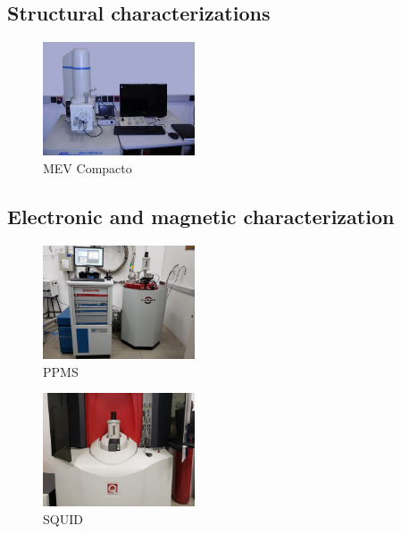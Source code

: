 \documentclass[prd,amsfonts,onecolumn,superscriptaddress,aps,nofootinbib,11pt]{revtex4}
\begin{document}
\subsection{Structural characterizations}

\begin{figure}[H]
    \centering
    \includegraphics[width=0.4\textwidth]{experiments/MEV_compacto0.jpg}
    \caption{MEV Compacto}
    \label{fig:exp:MEV}
\end{figure}


\subsection{Electronic and magnetic characterization}

\begin{figure}[H]
    \centering
    \includegraphics[width=0.4\textwidth]{experiments/PPMS.jpg}
    \caption{PPMS}
    \label{fig:exp:ppms}
\end{figure}


\begin{figure}[H]
    \centering
    \includegraphics[width=0.4\textwidth]{experiments/SQUID.jpg}
    \caption{SQUID}
    \label{fig:exp:squid}
\end{figure}
\end{document}
